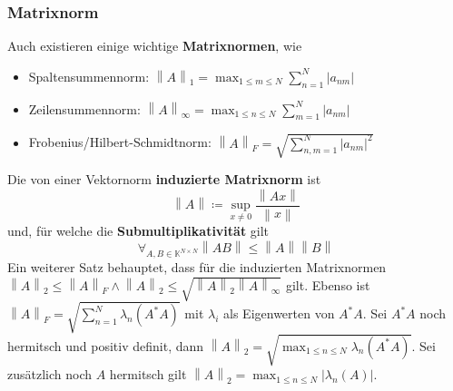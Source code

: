 \documentclass{article}
\newcommand\norm[1]{\left\lVert#1\right\rVert}
\begin{document}
\subsubsection{Matrixnorm}
    Auch existieren einige wichtige \textbf{Matrixnormen}, wie
    \begin{itemize}
        \item Spaltensummennorm: $\norm{A}_1=\max_{1\le m\le N}\sum_{n=1}^N|a_{nm}|$
        \item Zeilensummennorm: $\norm{A}_\infty=\max_{1\le n\le N}\sum_{m=1}^N|a_{nm}|$
        \item Frobenius/Hilbert-Schmidtnorm: $\norm{A}_F=\sqrt{\sum_{n,m=1}^N|a_{nm}|^2 }$
    \end{itemize}
    Die von einer Vektornorm \textbf{induzierte Matrixnorm} ist
    \begin{equation}
        \norm{A}\coloneqq \sup_{x\not= 0}\frac{\norm{Ax}}{\norm{x}}
    \end{equation}
    und, für welche die \textbf{Submultiplikativität} gilt
    \begin{equation}
        \forall_{A,B\in\mathbb{K}^{N\times N}}\norm{AB}\le\norm{A}\norm{B}
    \end{equation}
    Ein weiterer Satz behauptet, dass für die induzierten Matrixnormen $\norm{A}_2 \le \norm{A}_F \wedge \norm{A}_2 \le \sqrt{\norm{A}_2\norm{A}_\infty}$ gilt. Ebenso ist $\norm{A}_F= \sqrt{\sum_{n=1}^N\lambda_n(A^*A)}$ mit $\lambda_i$ als Eigenwerten von $A^*A$.\newline
    Sei $A^*A$ noch hermitsch und positiv definit, dann $\norm{A}_2 = \sqrt{\max_{1\le n\le N}\lambda_n(A^*A)}$. Sei zusätzlich noch $A$ hermitsch gilt $\norm{A}_2=\max_{1\le n\le N}|\lambda_n(A)|$.
\end{document}
